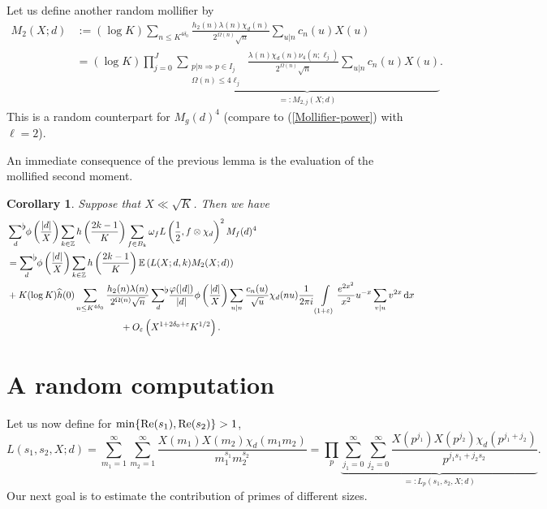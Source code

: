 \documentclass[a4paper,10pt,twoside]{amsart}
\newtheorem{corollary}[theorem]{Corollary}
\theoremstyle{definition}
\numberwithin{equation}{section}
\newcommand\Z{\mathbb{Z}}
\newcommand\eps{\varepsilon}
\renewcommand{\Re}{\textnormal{Re}}
\renewcommand\:{\colon}
\newcommand{\sumflat}{\mathop{{\sum}^{\raisebox{-3pt}{\makebox[0pt][l]{$\flat$}}}}}
\begin{document}
Let us define another random mollifier by 
\begin{align*}
M_2(X;d)&:=(\log K)\sum_{n\leq K^{4\delta_0}}\frac{h_2(n)\lambda(n)\chi_d(n)}{2^{\Omega(n)}\sqrt n}\sum_{u|n}c_n(u)X(u) \\
&=(\log K)\prod_{j=0}^J \underbrace{\sum_{\substack{p|n\Rightarrow p\in I_j\\
\Omega(n)\leq 4\ell_j }}\frac{\lambda(n)\chi_d(n)\nu_4(n;\ell_j)}{2^{\Omega(n)}\sqrt n}\sum_{u|n}c_n(u)X(u)}_{=: M_{2,j}(X;d)}. 
\end{align*}
This is a random counterpart for $M_g(d)^4$ (compare to (\ref{Mollifier-power}) with $\ell=2$).

An immediate consequence of the previous lemma is the evaluation of the mollified second moment.
\begin{corollary}\label{mollified-moment-connection}
Suppose that $X\ll\sqrt K$. Then we have
\begin{align}\label{off-diag-main}
&\sumflat_{d}\,\phi\left(\frac{|d|}X\right)\sum_{k\in\Z}h\left(\frac{2k-1}K\right)\sum_{f\in B_k}\omega_f L\left(\frac12,f\otimes\chi_d\right)^2M_f(d)^4 \nonumber\\
&=\sumflat_{d}\,\phi\left(\frac{|d|}X\right)\sum_{k\in\Z}h\left(\frac{2k-1}K\right)\mathbb E\left(L(X;d,k)M_2(X;d)\right) \nonumber\\
&+K(\log K)\widehat h(0)\sum_{n\leq K^{4\delta_0}}\frac{h_2(n)\lambda(n)}{2^{\Omega(n)}\sqrt n}\sumflat_{d}\,\frac{\varphi(|d|)}{|d|}\phi\left(\frac{|d|}X\right)\sum_{u|n}\frac{c_n(u)}{\sqrt u}\chi_d(nu)\frac1{2\pi i}\int\limits_{(1+\eps)}\frac{e^{2x^2}}{x^2}u^{-x}\sum_{v|u}v^{2x}\,\mathrm d x \\&\qquad\qquad\qquad\qquad\qquad\qquad+O_\eps\left(X^{1+2\delta_0+\eps}K^{1/2}\right). \nonumber
\end{align}
\end{corollary}

\section{A random computation}

\noindent Let us now define for $\min\{\Re(s_1),\Re(s_2)\}>1$,
\[
L(s_1,s_2,X;d)=\sum_{m_1=1}^\infty\sum_{m_2=1}^\infty\frac{X(m_1)X(m_2)\chi_d(m_1m_2)}{m_1^{s_1}m_2^{s_2}}=\prod_p\underbrace{\sum_{j_1=0}^\infty\sum_{j_2=0}^\infty\frac{X(p^{j_1})X(p^{j_2})\chi_d(p^{j_1+j_2})}{p^{j_1s_1+j_2s_2}}}_{=:L_p(s_1,s_2,X;d)}.
\] 
Our next goal is to estimate the contribution of primes of different sizes.
\end{document}
